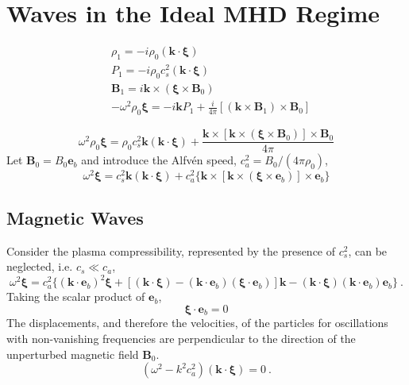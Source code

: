 \documentclass[12pt,a4paper]{article}
\renewcommand{\vec}[1]{\boldsymbol{#1}}
\begin{document}
\section{Waves in the Ideal MHD Regime}
\begin{align}
& \rho_1 = -i \rho_0(\vec{k} \cdot \vec{\xi}) \\
& P_1 = -i \rho_0 c_s^2(\vec{k} \cdot \vec{\xi}) \\
& \vec{B}_1 = i\vec{k}\times (\vec{\xi} \times \vec{B}_0) \\
& -\omega^2 \rho_0 \vec{\xi} = -i \vec{k} P_1 +\frac{i}{4\pi} [(\vec{k} \times \vec{B}_1) \times \vec{B}_0]
\end{align}

\begin{equation}
\omega^2 \rho_0 \vec{\xi} = \rho_0 c_s^2 \vec{k}(\vec{k} \cdot \vec{\xi}) +\frac{\vec{k} \times [\vec{k} \times (\vec{\xi} \times \vec{B}_0)] \times \vec{B}_0}{4\pi} 
\end{equation}
Let $\vec{B}_0 = B_0 \vec{e}_b$ and introduce the Alfv\'en speed, $c_a^2 = B_0/(4\pi \rho_0)$, 
\begin{equation}
\omega^2 \vec{\xi} = c_s^2 \vec{k}(\vec{k} \cdot \vec{\xi}) +c_a^2\{\vec{k} \times [\vec{k} \times (\vec{\xi} \times \vec{e}_b)] \times \vec{e}_b\}
\end{equation}



\subsection{Magnetic Waves}
Consider the plasma compressibility, represented by the presence of $c_s^2$, can be neglected, i.e. $c_s \ll c_a$,
\begin{equation}
\omega^2 \vec{\xi} = c_a^2\{(\vec{k} \cdot \vec{e}_b)^2 \vec{\xi} +[(\vec{k} \cdot \vec{\xi}) -(\vec{k} \cdot \vec{e}_b)(\vec{\xi} \cdot \vec{e}_b)]\vec{k} - (\vec{k} \cdot \vec{\xi})(\vec{k} \cdot \vec{e}_b)\vec{e}_b \} ~.
\end{equation}
Taking the scalar product of $\vec{e}_b$,  
\begin{equation*}
\vec{\xi} \cdot \vec{e}_b = 0
\end{equation*}
The displacements, and therefore the velocities, of the particles for oscillations with non-vanishing frequencies are perpendicular to the direction of the unperturbed magnetic field $\vec{B}_0$. 
\begin{equation*}
(\omega^2 -k^2 c_a^2)(\vec{k} \cdot \vec{\xi}) = 0 ~.
\end{equation*}
\end{document}

